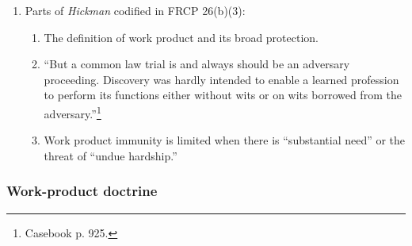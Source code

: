 \begin{enumerate}
\begin{itemize}
        \item Restricting discovery preserves adversarial proceedings.
        \item Requiring lawyers to disclose their work product would force 
        them to become witnesses for ``other witnesses' 
        stories.''\footnote{Casebook p. 925--926.}
    \end{itemize}
    \item Parts of \emph{Hickman} codified in FRCP 26(b)(3):
    \begin{enumerate}
        \item The definition of work product and its broad protection.
        \item ``But a common law trial is and always should be an adversary 
        proceeding. Discovery was hardly intended to enable a learned 
        profession to perform its functions either without wits or on wits 
        borrowed from the adversary.''\footnote{Casebook p. 925.}
        \item Work product immunity is limited when there is ``substantial 
        need'' or the threat of ``undue hardship.''
    \end{enumerate}
\end{enumerate}

\subsubsection{Work-product doctrine}

